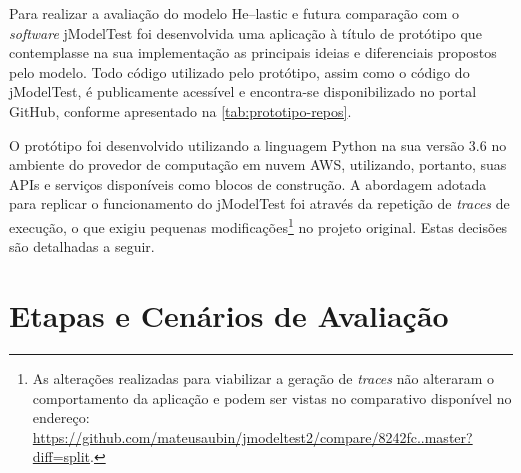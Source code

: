 \documentclass[english,brazilian]{UNISINOSmonografia} %
\begin{document}




Para realizar a avaliação do modelo \textsf{He}--lastic e futura comparação com o \textit{software} jModelTest foi desenvolvida uma aplicação à título de protótipo que contemplasse na sua implementação as principais ideias e diferenciais propostos pelo modelo.
Todo código utilizado pelo protótipo, assim como o código do jModelTest, é publicamente acessível e encontra-se disponibilizado no portal GitHub, conforme apresentado na \autoref{tab:prototipo-repos}.


O protótipo foi desenvolvido utilizando a linguagem Python na sua versão 3.6 no ambiente do provedor de computação em nuvem AWS, utilizando, portanto, suas APIs e serviços disponíveis como blocos de construção.
A abordagem adotada para replicar o funcionamento do jModelTest foi através da repetição de \textit{traces} de execução, o que exigiu pequenas modificações\footnote{
	As alterações realizadas para viabilizar a geração de \textit{traces} não alteraram o comportamento da aplicação e podem ser vistas no comparativo disponível no endereço: \url{https://github.com/mateusaubin/jmodeltest2/compare/8242fc..master?diff=split}.
} no projeto original.
Estas decisões são detalhadas a seguir.



\section{Etapas e Cenários de Avaliação}
\label{sec:metodologia-etapasecenarios}
\end{document}
